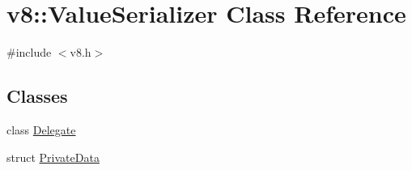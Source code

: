 \hypertarget{classv8_1_1ValueSerializer}{}\section{v8\+:\+:Value\+Serializer Class Reference}
\label{classv8_1_1ValueSerializer}


{\ttfamily \#include $<$v8.\+h$>$}

\subsection*{Classes}
\begin{DoxyCompactItemize}
\item 
class \mbox{\hyperlink{classv8_1_1ValueSerializer_1_1Delegate}{Delegate}}
\item 
struct \mbox{\hyperlink{structv8_1_1ValueSerializer_1_1PrivateData}{Private\+Data}}
\end{DoxyCompactItemize}
